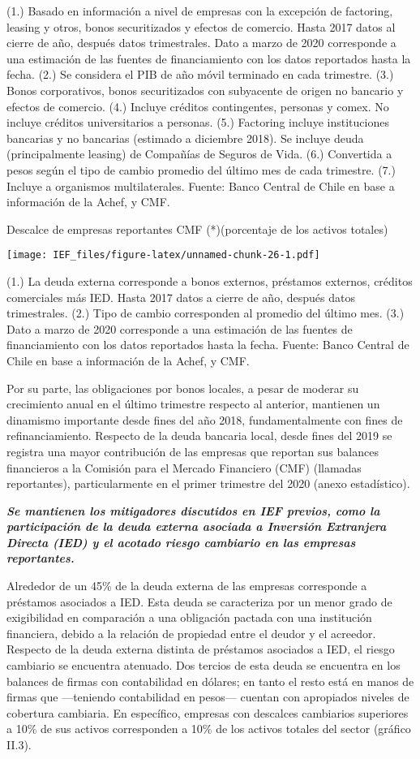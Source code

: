 \documentclass[
]{book}
\begin{document}
(1.) Basado en información a nivel de empresas con la excepción de factoring, leasing y otros, bonos securitizados y efectos de comercio. Hasta 2017 datos al cierre de año, después datos trimestrales. Dato a marzo de 2020 corresponde a una estimación de las fuentes de financiamiento con los datos reportados hasta la fecha.
(2.) Se considera el PIB de año móvil terminado en cada trimestre.
(3.) Bonos corporativos, bonos securitizados con subyacente de origen no bancario y efectos de comercio.
(4.) Incluye créditos contingentes, personas y comex. No incluye créditos universitarios a personas.
(5.) Factoring incluye instituciones bancarias y no bancarias (estimado a diciembre 2018). Se incluye deuda (principalmente leasing) de Compañías de Seguros de Vida.
(6.) Convertida a pesos según el tipo de cambio promedio del último mes de cada trimestre.
(7.) Incluye a organismos multilaterales.
Fuente: Banco Central de Chile en base a información de la Achef, y CMF.

Descalce de empresas reportantes CMF (*)(porcentaje de los activos totales)

\texttt{[image: IEF\_files/figure-latex/unnamed-chunk-26-1.pdf]}

(1.) La deuda externa corresponde a bonos externos, préstamos externos, créditos comerciales más IED. Hasta 2017 datos a cierre de año, después datos trimestrales.
(2.) Tipo de cambio corresponden al promedio del último mes.
(3.) Dato a marzo de 2020 corresponde a una estimación de las fuentes de financiamiento con los datos reportados hasta la fecha.
Fuente: Banco Central de Chile en base a información de la Achef, y CMF.

Por su parte, las obligaciones por bonos locales, a pesar de moderar su
crecimiento anual en el último trimestre respecto al anterior, mantienen un
dinamismo importante desde fines del año 2018, fundamentalmente con
fines de refinanciamiento. Respecto de la deuda bancaria local, desde fines
del 2019 se registra una mayor contribución de las empresas que reportan sus
balances financieros a la Comisión para el Mercado Financiero (CMF) (llamadas
reportantes), particularmente en el primer trimestre del 2020 (anexo estadístico).

\textbf{\emph{Se mantienen los mitigadores discutidos en IEF previos, como la
participación de la deuda externa asociada a Inversión Extranjera
Directa (IED) y el acotado riesgo cambiario en las empresas reportantes.}}

Alrededor de un 45\% de la deuda externa de las empresas corresponde a
préstamos asociados a IED. Esta deuda se caracteriza por un menor grado
de exigibilidad en comparación a una obligación pactada con una institución
financiera, debido a la relación de propiedad entre el deudor y el acreedor.
Respecto de la deuda externa distinta de préstamos asociados a IED, el riesgo
cambiario se encuentra atenuado. Dos tercios de esta deuda se encuentra
en los balances de firmas con contabilidad en dólares; en tanto el resto
está en manos de firmas que ---teniendo contabilidad en pesos--- cuentan
con apropiados niveles de cobertura cambiaria. En específico, empresas con
descalces cambiarios superiores a 10\% de sus activos corresponden a 10\% de
los activos totales del sector (gráfico II.3).
\end{document}
